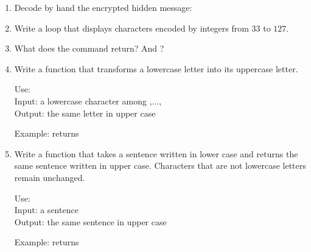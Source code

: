\documentclass[11pt,class=report,crop=false]{standalone}
\begin{document}

\begin{activite}



\begin{enumerate}
  \item Decode by hand the encrypted hidden message: 

      
  \item Write a loop that displays characters encoded by integers from $33$ to $127$.
  
  \item What does the command   return? And ?
  
  \item Write a function  that transforms a lowercase letter into its uppercase letter.
  
  \begin{fonction}
  
   Use: \\
   Input: a lowercase character among ,...,\\
   Output: the same letter in upper case
  
  \medskip
     
   Example:  returns 
  \end{fonction} 
  
    \item Write a function  that takes a sentence written in lower case and returns the same sentence written in upper case. Characters that are not lowercase letters remain unchanged.
  
  \begin{fonction}[\ci{uppercase()}]
   Use: \\
   Input: a sentence\\
   Output: the same sentence in upper case
  
  \medskip
     
   Example:  returns 
  \end{fonction} 
   

\end{enumerate}
\end{activite}
\end{document}
